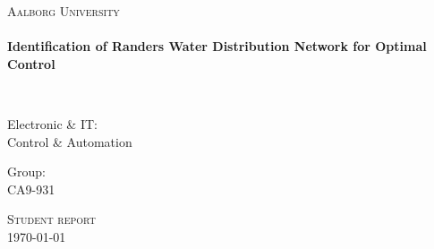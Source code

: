 \thispagestyle{empty}

\begin{center}

\vspace*{\fill}

\textsc{\LARGE Aalborg University}\\[1.0cm]

\HRule \\[0.2cm]
{ \LARGE \bfseries  Identification of Randers Water Distribution Network for Optimal Control \\[0.2cm] }

\HRule \\[1.5cm]%

\begin{minipage}{0.4\textwidth}
\begin{flushleft} \large
Electronic \& IT:\\
Control \& Automation
\end{flushleft}
\end{minipage}
\begin{minipage}{0.4\textwidth}
\begin{flushright} \large
Group: \\
CA9-931
\end{flushright}
\end{minipage}

\vspace*{\fill}

\textsc{\Large Student report}\\[1.0cm]

{\large \today}

\end{center}